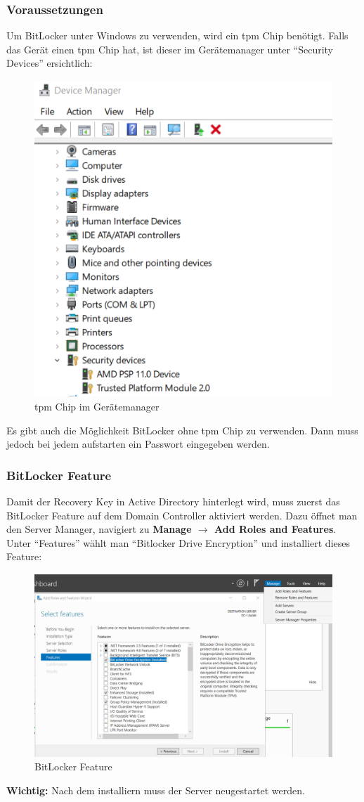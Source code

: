 \subsubsection{Voraussetzungen}
Um BitLocker unter Windows zu verwenden, wird ein \acrfull{tpm} Chip benötigt.
Falls das Gerät einen \acrshort{tpm} Chip hat, ist dieser im Gerätemanager unter ``Security Devices'' ersichtlich:
\begin{figure}[H]
    \centering
    \includegraphics[width=0.6\linewidth]{../img/Encryption/tpm-chip-device-manager.png}
    \caption{\acrshort{tpm} Chip im Gerätemanager}
\end{figure}
Es gibt auch die Möglichkeit BitLocker ohne \acrshort{tpm} Chip zu verwenden. Dann muss jedoch bei jedem aufstarten ein Passwort eingegeben werden.

\subsubsection{BitLocker Feature}
Damit der Recovery Key in Active Directory hinterlegt wird, muss zuerst das BitLocker Feature auf dem Domain Controller aktiviert werden.
Dazu öffnet man den Server Manager, navigiert zu \textbf{Manage $\rightarrow$ Add Roles and Features}.
Unter ``Features'' wählt man ``Bitlocker Drive Encryption'' und installiert dieses Feature:
\begin{figure}[H]
    \centering
    \includegraphics[width=\linewidth]{../img/Encryption/bitlocker-feature.png}
    \caption{BitLocker Feature}
\end{figure}
\textbf{Wichtig:} Nach dem installiern muss der Server neugestartet werden.

